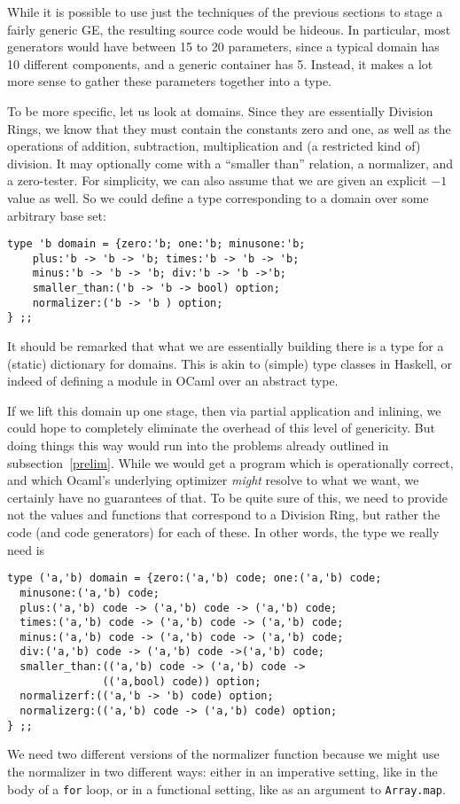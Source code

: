 \documentclass[11pt]{elsart}
\begin{document}
While it is possible to use just the techniques of the previous sections
to stage a fairly generic GE, the resulting source code would be hideous.  In
particular, most generators would have between 15 to 20 parameters, 
since a typical domain has 10 different components, and a generic 
container has 5.  Instead, it makes a lot more sense to gather these
parameters together into a type.

To be more specific, let us look at domains.  Since they are essentially
Division Rings, we know that they must contain the constants zero and one, 
as well as the operations of addition, subtraction, multiplication
and (a restricted kind of) division.  It may optionally come with
a ``smaller than'' relation, a normalizer, and a zero-tester.  For
simplicity, we can also assume that we are given an explicit $-1$ value
as well.  So we could define a type corresponding to a domain over
some arbitrary base set:
\begin{small}
\begin{verbatim}
type 'b domain = {zero:'b; one:'b; minusone:'b;
    plus:'b -> 'b -> 'b; times:'b -> 'b -> 'b;
    minus:'b -> 'b -> 'b; div:'b -> 'b ->'b;
    smaller_than:('b -> 'b -> bool) option;
    normalizer:('b -> 'b ) option;
} ;;
\end{verbatim}
\end{small}
\noindent It should be remarked that what we are essentially 
building there is a type for a (static) dictionary for domains.
This is akin to (simple) type classes in Haskell, or indeed of
defining a module in OCaml over an abstract type.

If we lift this domain up one stage, then via partial application 
and inlining, we could hope to completely eliminate the overhead
of this level of genericity.  But doing things this way would run
into the problems already outlined in subsection~\ref{prelim}.
While we would get a program which is operationally correct, and which
Ocaml's underlying optimizer \emph{might} resolve to what we want,
we certainly have no guarantees of that.  To be quite sure of 
this, we need to provide not the values and functions that
correspond to a Division Ring, but rather the code (and code
generators) for each of these.  In other words, the type we really
need is
\begin{small}
\begin{verbatim}
type ('a,'b) domain = {zero:('a,'b) code; one:('a,'b) code;
  minusone:('a,'b) code;
  plus:('a,'b) code -> ('a,'b) code -> ('a,'b) code; 
  times:('a,'b) code -> ('a,'b) code -> ('a,'b) code;
  minus:('a,'b) code -> ('a,'b) code -> ('a,'b) code; 
  div:('a,'b) code -> ('a,'b) code ->('a,'b) code;
  smaller_than:(('a,'b) code -> ('a,'b) code -> 
               (('a,bool) code)) option;
  normalizerf:(('a,'b -> 'b) code) option;
  normalizerg:(('a,'b) code -> ('a,'b) code) option;
} ;;
\end{verbatim}
\end{small}
\noindent  We need two different versions of the normalizer function
because we might use the normalizer in two different ways: either
in an imperative setting, like in the body of a \texttt{for} loop, 
or in a functional setting, like as an argument to \texttt{Array.map}.
\end{document}
